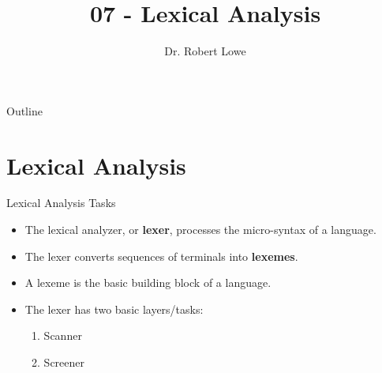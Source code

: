 \documentclass[]{beamer}
\title{07 - Lexical Analysis}
\author{Dr. Robert Lowe\\}
\institute[Maryville College] %
{
  Division of Mathematics and Computer Science\\
  Maryville College
}
\date[]{}
\begin{document}
\begin{frame}
  \titlepage
\end{frame}

\begin{frame}{Outline}
  \tableofcontents
\end{frame}





\section{Lexical Analysis}

\begin{frame}{Lexical Analysis Tasks}
    \begin{itemize}[<+->]
        \item The lexical analyzer, or \textbf{lexer}, processes the
            micro-syntax of a language.
        \item The lexer converts sequences of terminals into
            \textbf{lexemes}.
        \item A lexeme is the basic building block of a language.
        \item The lexer has two basic layers/tasks:
        \begin{enumerate}
            \item Scanner
            \item Screener
        \end{enumerate}
    \end{itemize}
\end{frame}
\end{document}
